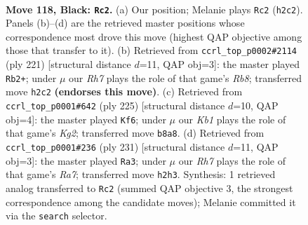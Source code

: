 \documentclass[11pt]{article}
\begin{document}
\clearpage

\begin{figure}[p]\centering
\begin{subfigure}{0.46\textwidth}\centering
\resizebox{\linewidth}{!}{%
\newchessgame
\chessboard[
  setfen={1k6/3R4/4p3/4P3/5PR1/8/7r/5K2 b - - 22 118},
  showmover=false,
  pgfstyle=straightmove, color=movearrow, markmove={h2-c2}
]}
\caption{}
\end{subfigure}\hfill
\begin{subfigure}{0.46\textwidth}\centering
\resizebox{\linewidth}{!}{%
\newchessgame
\chessboard[
  setfen={7R/8/6k1/6p1/4P3/5P2/6K1/1r6 b - - 60 111},
  showmover=false,
  pgfstyle=straightmove, color=movearrow, markmove={b1-b2}
]}
\caption{}
\end{subfigure}
\\[4pt]
\begin{subfigure}{0.46\textwidth}\centering
\resizebox{\linewidth}{!}{%
\newchessgame
\chessboard[
  setfen={8/6k1/7p/8/4RPP1/r7/5K2/8 b - - 2 113},
  showmover=false,
  pgfstyle=straightmove, color=movearrow, markmove={g7-f6}
]}
\caption{}
\end{subfigure}\hfill
\begin{subfigure}{0.46\textwidth}\centering
\resizebox{\linewidth}{!}{%
\newchessgame
\chessboard[
  setfen={8/8/2R5/4p1k1/4P3/5PK1/r7/8 b - - 0 116},
  showmover=false,
  pgfstyle=straightmove, color=movearrow, markmove={a2-a3}
]}
\caption{}
\end{subfigure}
\caption{\textbf{Move 118, Black: \texttt{Rc2}.} (a) Our position; Melanie plays \texttt{Rc2} (\texttt{h2c2}). Panels (b)--(d) are the retrieved master positions whose correspondence most drove this move (highest QAP objective among those that transfer to it). (b) Retrieved from \texttt{ccrl\_top\_p0002\#2114} (ply 221) [structural distance $d$=11, QAP obj=3]: the master played \texttt{Rb2+}; under $\mu$ our \emph{Rh7} plays the role of that game's \emph{Rb8}; transferred move \texttt{h2c2} \textbf{(endorses this move)}. (c) Retrieved from \texttt{ccrl\_top\_p0001\#642} (ply 225) [structural distance $d$=10, QAP obj=4]: the master played \texttt{Kf6}; under $\mu$ our \emph{Kb1} plays the role of that game's \emph{Kg2}; transferred move \texttt{b8a8}. (d) Retrieved from \texttt{ccrl\_top\_p0001\#236} (ply 231) [structural distance $d$=11, QAP obj=3]: the master played \texttt{Ra3}; under $\mu$ our \emph{Rh7} plays the role of that game's \emph{Ra7}; transferred move \texttt{h2h3}. Synthesis: 1 retrieved analog transferred to \texttt{Rc2} (summed QAP objective 3, the strongest correspondence among the candidate moves); Melanie committed it via the \texttt{search} selector.}
\label{fig:thought-m235}
\end{figure}
\end{document}

